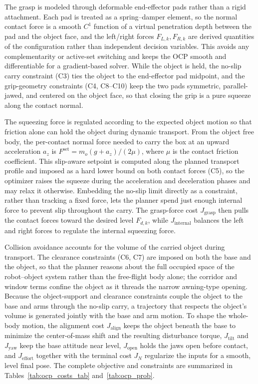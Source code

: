 \documentclass[letterpaper, 10 pt, conference]{ieeeconf}  %
\begin{document}
The grasp is modeled through deformable end-effector pads rather than a rigid attachment. Each pad is treated as a spring--damper element, so the normal contact force is a smooth $C^1$ function of a virtual penetration depth between the pad and the object face, and the left/right forces $F_{L,k},F_{R,k}$ are derived quantities of the configuration rather than independent decision variables. This avoids any complementarity or active-set switching and keeps the OCP smooth and differentiable for a gradient-based solver. While the object is held, the no-slip carry constraint (C3) ties the object to the end-effector pad midpoint, and the grip-geometry constraints (C4, C8--C10) keep the two pads symmetric, parallel-jawed, and centered on the object face, so that closing the grip is a pure squeeze along the contact normal.

The squeezing force is regulated according to the expected object motion so that friction alone can hold the object during dynamic transport. From the object free body, the per-contact normal force needed to carry the box at an upward acceleration $a_z$ is $F^{\mathrm{set}}=m_o(g+a_z)/(2\mu)$, where $\mu$ is the contact friction coefficient. This slip-aware setpoint is computed along the planned transport profile and imposed as a hard lower bound on both contact forces (C5), so the optimizer raises the squeeze during the acceleration and deceleration phases and may relax it otherwise. Embedding the no-slip limit directly as a constraint, rather than tracking a fixed force, lets the planner spend just enough internal force to prevent slip throughout the carry. The grasp-force cost $J_{\mathrm{grasp}}$ then pulls the contact forces toward the desired level $F_{d,k}$, while $J_{\mathrm{internal}}$ balances the left and right forces to regulate the internal squeezing force.

Collision avoidance accounts for the volume of the carried object during transport. The clearance constraints (C6, C7) are imposed on both the base and the object, so that the planner reasons about the full occupied space of the robot--object system rather than the free-flight body alone; the corridor and window terms confine the object as it threads the narrow awning-type opening. Because the object-support and clearance constraints couple the object to the base and arms through the no-slip carry, a trajectory that respects the object's volume is generated jointly with the base and arm motion. To shape the whole-body motion, the alignment cost $J_{\mathrm{align}}$ keeps the object beneath the base to minimize the center-of-mass shift and the resulting disturbance torque, $J_{\mathrm{tilt}}$ and $J_{\mathrm{yaw}}$ keep the base attitude near level, $J_{\mathrm{open}}$ holds the jaws open before contact, and $J_{\mathrm{effort}}$ together with the terminal cost $J_N$ regularize the inputs for a smooth, level final pose. The complete objective and constraints are summarized in Tables~\ref{tab:ocp_costs_tab} and~\ref{tab:ocp_prob}.
\end{document}
